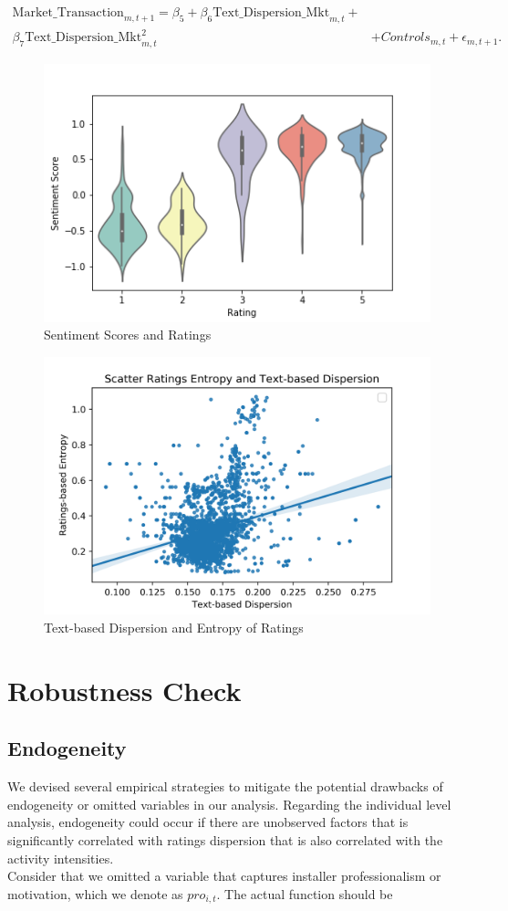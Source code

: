 \documentclass[msom,blindrev]{informs3}
\begin{document}
\begin{align}
   \text{Market\_Transaction}_{m,t+1}  =\beta_{5} + \beta_{6}\text{Text\_Dispersion\_Mkt}_{m,t}+ \\ \nonumber \beta_{7} \text{Text\_Dispersion\_Mkt}_{m,t} ^2 \label{reg: market-level-textbased}
   &+ Controls_{m,t}  +\epsilon_{m,t+1}.
\end{align}
\begin{figure}
	\centering
	\includegraphics[width=0.7\linewidth]{sentscore_violin.png}
	\caption{Sentiment Scores and Ratings}
	\label{sent_score_scatter}
\end{figure}
\begin{figure}
	\centering
	\includegraphics[width=0.7\linewidth]{regplot_text_d_ent_others.png}
	\caption{Text-based Dispersion and Entropy of Ratings}
	\label{regplot_text_d_ent_others}
\end{figure}
\section{Robustness Check}
\subsection{Endogeneity}

We devised several empirical strategies to mitigate the potential drawbacks of endogeneity or omitted variables in our analysis. Regarding the individual level analysis, endogeneity could occur if there are unobserved factors that is significantly correlated with ratings dispersion that is also correlated with the activity intensities.\\
Consider that we omitted a variable that captures installer professionalism or motivation, which we denote as $pro_{i,t}$. The actual function should be
\end{document}
